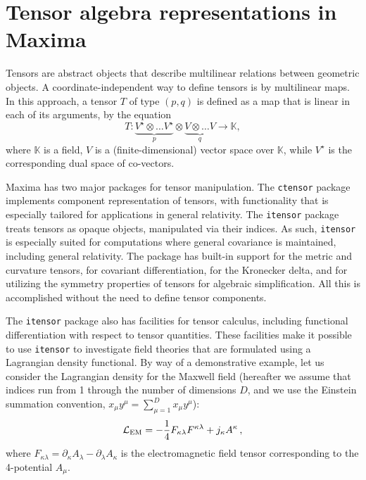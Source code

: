 \documentclass[twoside,reqno,11pt]{amsart}
\theoremstyle{definition}
\theoremstyle{remark}
\numberwithin{equation}{section}
\newcommand{\symb}[1]{{\tt #1}}
\begin{document}
\section{Tensor algebra representations in Maxima}
\label{sec:itensor}

Tensors are abstract objects that describe multilinear relations between geometric objects.
A coordinate-independent way to define tensors is by multilinear maps.
In this approach, a tensor $T$ of type $(p, q)$ is defined as a map that is linear in each of its arguments, by the equation
\begin{equation}
  T: \underbrace{V^\star \otimes \ldots V^\star}_{p } \otimes \underbrace{V \otimes \ldots V}_{q}  \rightarrow \mathbb{K},
\end{equation}
where $\mathbb{K}$ is a field, $V$ is a (finite-dimensional) vector space over $\mathbb{K}$, while $V^\star$ is the corresponding dual space of co-vectors.

Maxima has two major packages for tensor manipulation. The \symb{ctensor} package implements component representation of tensors, with functionality that is especially tailored for applications in general relativity. The \symb{itensor} package treats tensors as opaque objects, manipulated via their indices. As such, \symb{itensor} is especially suited for computations where general covariance is maintained, including general relativity. The package has built-in support for the metric and curvature tensors, for covariant differentiation, for the Kronecker delta, and for utilizing the symmetry properties of tensors for algebraic simplification. All this is accomplished without the need to define tensor components.

The \symb{itensor} package also has facilities for tensor calculus, including functional differentiation with respect to tensor quantities. These facilities make it possible to use \symb{itensor} to investigate field theories that are formulated using a Lagrangian density functional. By way of a demonstrative example, let us consider the Lagrangian density for the Maxwell field (hereafter we assume that indices run from 1 through the number of dimensions $D$, and we use the Einstein summation convention, $x_\mu y^\mu=\sum_{\mu=1}^D x_\mu y^\mu$):
\begin{equation}\label{eq:tenslag}
  \mathcal{ L}_{\rm EM} = -\frac{1}{4}F_{\kappa\lambda}F^{\kappa\lambda}+j_\kappa A^\kappa \, ,
\end{equation}
where $F_{\kappa\lambda}=\partial_\kappa A_\lambda-\partial_\lambda A_\kappa$ is the electromagnetic field tensor corresponding to the 4-potential $A_\mu$.
\end{document}
